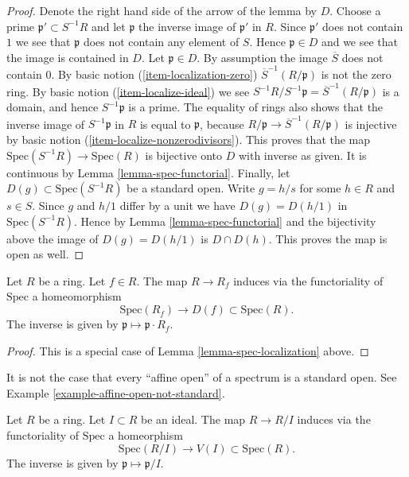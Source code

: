 \begin{proof}
Denote the right hand side of the arrow of the lemma by $D$.
Choose a prime $\mathfrak p' \subset S^{-1}R$ and let $\mathfrak p$
the inverse image of $\mathfrak p'$ in $R$. Since $\mathfrak p'$
does not contain $1$ we see that $\mathfrak p$ does not contain
any element of $S$. Hence $\mathfrak p \in D$ and we see that
the image is contained in $D$. Let $\mathfrak p \in D$.
By assumption the image $\overline{S}$ does not contain $0$.
By basic notion (\ref{item-localization-zero})
$\overline{S}^{-1}(R/\mathfrak p)$ is not the zero ring.
By basic notion (\ref{item-localize-ideal}) we see
$S^{-1}R / S^{-1}\mathfrak p = \overline{S}^{-1}(R/\mathfrak p)$
is a domain, and hence $S^{-1}\mathfrak p$ is a prime.
The equality of rings also shows that the inverse image of
$S^{-1}\mathfrak p$ in $R$ is equal to $\mathfrak p$,
because $R/\mathfrak p \to \overline{S}^{-1}(R/\mathfrak p)$
is injective by basic notion (\ref{item-localize-nonzerodivisors}).
This proves that the map $\text{Spec}(S^{-1}R) \to \text{Spec}(R)$
is bijective onto $D$ with inverse as given.
It is continuous by Lemma \ref{lemma-spec-functorial}.
Finally, let $D(g) \subset \text{Spec}(S^{-1}R)$ be a standard
open. Write $g = h/s$ for some $h\in R$ and $s\in S$.
Since $g$ and $h/1$ differ by a unit we have $D(g) =
D(h/1)$ in $\text{Spec}(S^{-1}R)$.
Hence by Lemma \ref{lemma-spec-functorial} and the bijectivity
above the image of $D(g) = D(h/1)$ is $D \cap D(h)$.
This proves the map is open as well.
\end{proof}

\begin{lemma}
\label{lemma-standard-open}
Let $R$ be a ring. Let $f \in R$.
The map $R \to R_f$ induces via the functoriality of
$\text{Spec}$ a homeomorphism
$$
\text{Spec}(R_f) \longrightarrow D(f) \subset \text{Spec}(R).
$$
The inverse is given by $\mathfrak p \mapsto \mathfrak p \cdot R_f$.
\end{lemma}

\begin{proof}
This is a special case of Lemma \ref{lemma-spec-localization}
above.
\end{proof}

\noindent
It is not the case that every ``affine open'' of a
spectrum is a standard open. See
Example \ref{example-affine-open-not-standard}.

\begin{lemma}
\label{lemma-spec-closed}
Let $R$ be a ring. Let $I \subset R$ be an ideal.
The map $R \to R/I$ induces via the functoriality of
$\text{Spec}$ a homeorphism
$$
\text{Spec}(R/I) \longrightarrow V(I) \subset \text{Spec}(R).
$$
The inverse is given by $\mathfrak p \mapsto \mathfrak p / I$.
\end{lemma}

